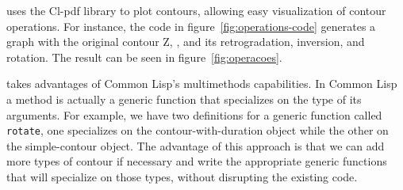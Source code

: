 \documentclass[a0paper]{sciposter}
\begin{document}
\begin{multicols}{3}
\goiaba{} uses the Cl-pdf library
to plot contours, allowing easy visualization of contour operations.
For instance, the code in figure~\ref{fig:operations-code} generates a
graph with the original contour Z, 
, and its
retrogradation, inversion, and rotation. The result can be seen in
figure~\ref{fig:operacoes}.

\goiaba{} takes advantages of Common Lisp's multimethods capabilities.
In Common Lisp a method is actually a generic function that
specializes on the type of its arguments. For example, we have two
definitions for a generic function called \texttt{rotate}, one
specializes on the contour-with-duration object while the other on the
simple-contour object. The advantage of this approach is that we can
add more types of contour if necessary and write the appropriate
generic functions that will specialize on those types, without
disrupting the existing code.


\end{multicols}
\end{document}
